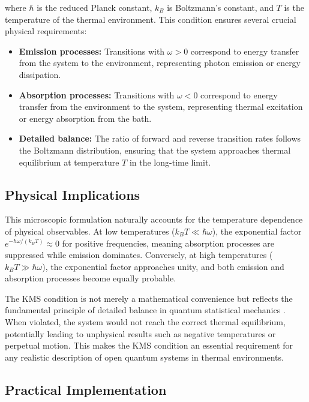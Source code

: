 \noindent where $\hbar$ is the reduced Planck constant, $k_B$ is Boltzmann's constant, and $T$ is the temperature of the thermal environment. This condition ensures several crucial physical requirements:

\begin{itemize}
	\item \textbf{Emission processes:} Transitions with $\omega > 0$ correspond to energy transfer from the system to the environment, representing photon emission or energy dissipation.

	\item \textbf{Absorption processes:} Transitions with $\omega < 0$ correspond to energy transfer from the environment to the system, representing thermal excitation or energy absorption from the bath.

	\item \textbf{Detailed balance:} The ratio of forward and reverse transition rates follows the Boltzmann distribution, ensuring that the system approaches thermal equilibrium at temperature $T$ in the long-time limit.
\end{itemize}

\subsection{Physical Implications}
\label{subsec:physical_implications}

\noindent This microscopic formulation naturally accounts for the temperature dependence of physical observables. At low temperatures ($k_B T \ll \hbar\omega$), the exponential factor $e^{-\hbar\omega/(k_B T)} \approx 0$ for positive frequencies, meaning absorption processes are suppressed while emission dominates. Conversely, at high temperatures ($k_B T \gg \hbar\omega$), the exponential factor approaches unity, and both emission and absorption processes become equally probable.

\noindent The KMS condition is not merely a mathematical convenience but reflects the fundamental principle of detailed balance in quantum statistical mechanics \cite{Breuer2002}. When violated, the system would not reach the correct thermal equilibrium, potentially leading to unphysical results such as negative temperatures or perpetual motion. This makes the KMS condition an essential requirement for any realistic description of open quantum systems in thermal environments.

\subsection{Practical Implementation}
\label{subsec:practical_implementation}

